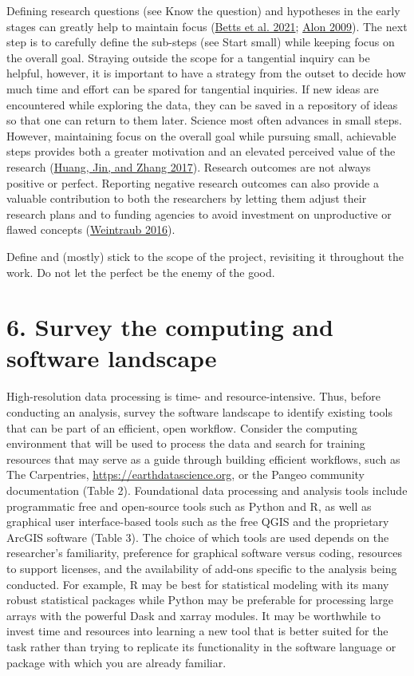 \documentclass[
  12pt,
]{article}
\begin{document}
Defining research questions (see Know the question) and hypotheses in
the early stages can greatly help to maintain focus
(\protect\hyperlink{ref-betts2021}{Betts et al. 2021};
\protect\hyperlink{ref-alon2009}{Alon 2009}). The next step is to
carefully define the sub-steps (see Start small) while keeping focus on
the overall goal. Straying outside the scope for a tangential inquiry
can be helpful, however, it is important to have a strategy from the
outset to decide how much time and effort can be spared for tangential
inquiries. If new ideas are encountered while exploring the data, they
can be saved in a repository of ideas so that one can return to them
later. Science most often advances in small steps. However, maintaining
focus on the overall goal while pursuing small, achievable steps
provides both a greater motivation and an elevated perceived value of
the research (\protect\hyperlink{ref-huang2017}{Huang, Jin, and Zhang
2017}). Research outcomes are not always positive or perfect. Reporting
negative research outcomes can also provide a valuable contribution to
both the researchers by letting them adjust their research plans and to
funding agencies to avoid investment on unproductive or flawed concepts
(\protect\hyperlink{ref-weintraub2016}{Weintraub 2016}).

Define and (mostly) stick to the scope of the project, revisiting it
throughout the work. Do not let the perfect be the enemy of the good.

\hypertarget{survey-the-computing-and-software-landscape}{%
\section{6. Survey the computing and software
landscape}\label{survey-the-computing-and-software-landscape}}

High-resolution data processing is time- and resource-intensive. Thus,
before conducting an analysis, survey the software landscape to identify
existing tools that can be part of an efficient, open workflow. Consider
the computing environment that will be used to process the data and
search for training resources that may serve as a guide through building
efficient workflows, such as The Carpentries,
\url{https://earthdatascience.org}, or the Pangeo community
documentation (Table 2). Foundational data processing and analysis tools
include programmatic free and open-source tools such as Python and R, as
well as graphical user interface-based tools such as the free QGIS and
the proprietary ArcGIS software (Table 3). The choice of which tools are
used depends on the researcher's familiarity, preference for graphical
software versus coding, resources to support licenses, and the
availability of add-ons specific to the analysis being conducted. For
example, R may be best for statistical modeling with its many robust
statistical packages while Python may be preferable for processing large
arrays with the powerful Dask and xarray modules. It may be worthwhile
to invest time and resources into learning a new tool that is better
suited for the task rather than trying to replicate its functionality in
the software language or package with which you are already familiar.
\end{document}
